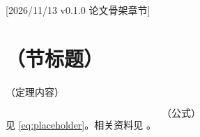 %
[2026/11/13 v0.1.0 论文骨架章节]
\section{（节标题）}
\begin{theorem}[定理名称]
（定理内容）
\end{theorem}
\begin{equation}\label{eq:placeholder}
  \text{（公式）}
\end{equation}
见 \cref{eq:placeholder}。相关资料见 \cite{placeholder}。
